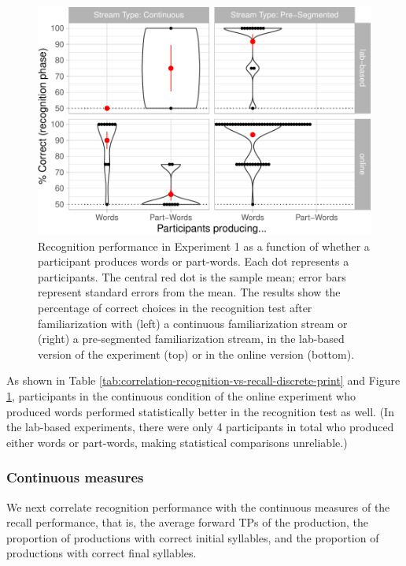 \documentclass[
]{article}
\begin{document}
\begin{figure}

{\centering \includegraphics[width=0.8\linewidth]{segmentation_recall_combined_for_revision3_files/figure-latex/correlation-recognition-vs-recall-discrete-plot-1} 

}

\caption{Recognition performance in Experiment 1 as a function of whether a participant produces words or part-words. Each dot represents a participants. The central red dot is the sample mean; error bars represent standard errors from the mean. The results show the percentage of correct choices in the recognition test after familiarization with (left) a continuous familiarization stream or (right) a pre-segmented familiarization stream, in the lab-based version of the experiment (top) or in the online version (bottom).}\label{fig:correlation-recognition-vs-recall-discrete-plot}
\end{figure}

As shown in Table
\ref{tab:correlation-recognition-vs-recall-discrete-print} and Figure
\ref{fig:correlation-recognition-vs-recall-discrete-plot}, participants
in the continuous condition of the online experiment who produced words
performed statistically better in the recognition test as well. (In the
lab-based experiments, there were only 4 participants in total who
produced either words or part-words, making statistical comparisons
unreliable.)

\subsubsection{Continuous measures}\label{continuous-measures}

We next correlate recognition performance with the continuous measures
of the recall performance, that is, the average forward TPs of the
production, the proportion of productions with correct initial
syllables, and the proportion of productions with correct final
syllables.
\end{document}
